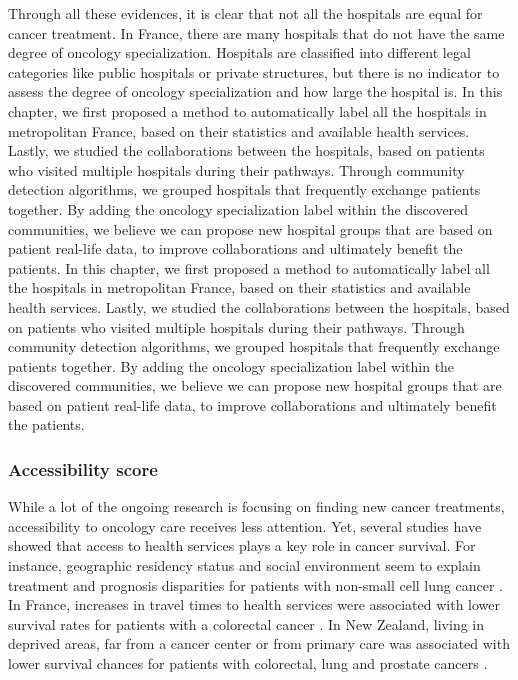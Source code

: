 Through all these evidences, it is clear that not all the hospitals are equal
for cancer treatment. In France, there are many hospitals that do not have the
same degree of oncology specialization. Hospitals are classified into different
legal categories like public hospitals or private structures, but there is no
indicator to assess the degree of oncology specialization and how large the
hospital is. In this chapter, we first proposed a method to automatically label
all the hospitals in metropolitan France, based on their statistics and
available health services. Lastly, we studied the collaborations between
the hospitals, based on patients who visited multiple hospitals during their
pathways. Through community detection algorithms, we grouped hospitals that
frequently exchange patients together. By adding the oncology specialization
label within the discovered communities, we believe we can propose new
hospital groups that are based on patient real-life data, to improve
collaborations and ultimately benefit the patients.
In this chapter, we first proposed a method to automatically label
all the hospitals in metropolitan France, based on their statistics and
available health services. Lastly, we studied the collaborations between
the hospitals, based on patients who visited multiple hospitals during their
pathways. Through community detection algorithms, we grouped hospitals that
frequently exchange patients together. By adding the oncology specialization
label within the discovered communities, we believe we can propose new
hospital groups that are based on patient real-life data, to improve
collaborations and ultimately benefit the patients.

\subsubsection{Accessibility score}

While a lot of the ongoing research is focusing on finding new cancer
treatments, accessibility to oncology care receives less attention. Yet, several
studies have showed that access to health services plays a key role in cancer
survival. For instance, geographic residency status and social environment seem
to explain treatment and prognosis disparities for patients with non-small cell
lung cancer \cite{johnson_treatment_2014}. In France, increases in travel times
to health services were associated with lower survival rates for patients with a
colorectal cancer \cite{dejardin_influence_2014}. In New Zealand, living in
deprived areas, far from a cancer center or from primary care was associated
with lower survival chances for patients with colorectal, lung and prostate
cancers \cite{haynes_cancer_2008}.

